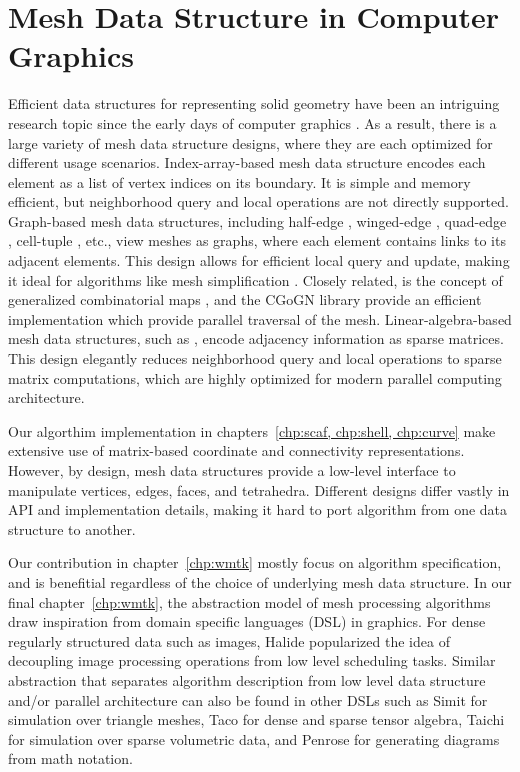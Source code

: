 \section{Mesh Data Structure in Computer Graphics}

Efficient data structures for representing solid geometry have been an intriguing
research topic since the early days of computer graphics \cite{Requicha1980}. As
a result, there is a large variety of mesh data structure designs, where they
are each optimized for different usage scenarios. Index-array-based mesh data
structure encodes each element as a list of vertex indices on its
boundary.  It is simple and memory efficient, but neighborhood query and local
operations are not directly supported.
Graph-based mesh data structures, including half-edge \cite{Maentylae1987},
winged-edge \cite{Baumgart1972}, quad-edge \cite{Guibas1985}, cell-tuple
\cite{Brisson1989}, etc., view meshes as graphs, where each element contains
links to its adjacent elements. This design allows for efficient local query
and update, making it ideal for algorithms like mesh simplification
\cite{garland1997surface}. 
{Closely related, is the concept of generalized combinatorial maps \cite{lienhardt1994n, dufourd1991obj3}, and the CGoGN library \cite{kraemer2014cgogn} provide an efficient implementation which provide parallel traversal of the mesh.}
Linear-algebra-based mesh data structures, such as
\cite{Dicarlo2014,Zayer2017,Mahmoud2021}, encode adjacency information as sparse
matrices.  This design elegantly reduces neighborhood query and local operations
to sparse matrix computations, which are highly optimized for modern parallel
computing architecture. 

%
Our algorthim implementation in chapters~\ref{chp:scaf, chp:shell, chp:curve} make extensive use of matrix-based coordinate and connectivity representations. 
However, by design, mesh data structures provide a low-level interface to
manipulate vertices, edges, faces, and tetrahedra.
Different designs differ vastly in API and implementation details, making it hard to port algorithm from one data structure to another. 

Our contribution in chapter~\ref{chp:wmtk} mostly focus on algorithm specification, and is benefitial regardless of the choice of underlying mesh data structure. 
In our final chapter~\ref*{chp:wmtk}, the abstraction model of mesh processing algorithms draw inspiration from domain
specific languages (DSL) in graphics.  For dense regularly structured data such
as images, Halide \cite{ragan2013halide} popularized the idea of decoupling image
processing operations from low level scheduling tasks. Similar abstraction that
separates algorithm description from low level data structure and/or parallel
architecture can also be found in other DSLs such as Simit
\cite{kjolstad2016simit} for simulation over triangle meshes, Taco
\cite{kjolstad2017taco} for dense and sparse tensor algebra, Taichi
\cite{hu2019taichi} for simulation over sparse volumetric data, and Penrose
\cite{ye2020penrose} for generating diagrams from math notation.


